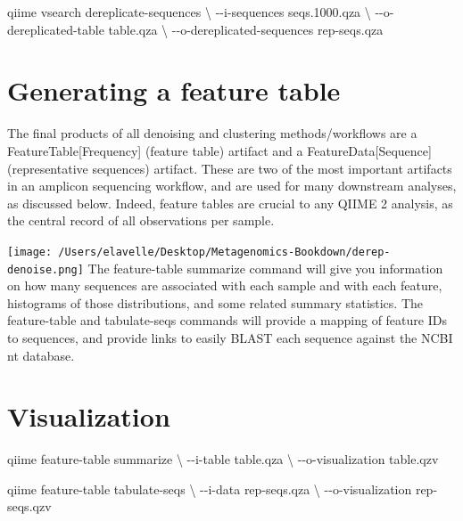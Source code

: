 \documentclass[
]{book}
\newenvironment{Shaded}{\begin{snugshade}}{\end{snugshade}}
\newcommand{\DataTypeTok}[1]{\textcolor[rgb]{0.13,0.29,0.53}{#1}}
\newcommand{\ExtensionTok}[1]{#1}
\newcommand{\NormalTok}[1]{#1}
\begin{document}
\begin{Shaded}
\begin{Highlighting}[]

\ExtensionTok{qiime}\NormalTok{ vsearch dereplicate{-}sequences }\DataTypeTok{\textbackslash{}}
\NormalTok{{-}{-}i{-}sequences seqs.1000.qza }\DataTypeTok{\textbackslash{}}
\NormalTok{{-}{-}o{-}dereplicated{-}table table.qza }\DataTypeTok{\textbackslash{}}
\NormalTok{{-}{-}o{-}dereplicated{-}sequences rep{-}seqs.qza }
\end{Highlighting}
\end{Shaded}

\hypertarget{generating-a-feature-table}{%
\section{Generating a feature table}\label{generating-a-feature-table}}

The final products of all denoising and clustering methods/workflows are a FeatureTable{[}Frequency{]} (feature table) artifact and a FeatureData{[}Sequence{]} (representative sequences) artifact. These are two of the most important artifacts in an amplicon sequencing workflow, and are used for many downstream analyses, as discussed below. Indeed, feature tables are crucial to any QIIME 2 analysis, as the central record of all observations per sample.

\texttt{[image: /Users/elavelle/Desktop/Metagenomics-Bookdown/derep-denoise.png]}
The feature-table summarize command will give you information on how many sequences are associated with each sample and with each feature, histograms of those distributions, and some related summary statistics. The feature-table and tabulate-seqs commands will provide a mapping of feature IDs to sequences, and provide links to easily BLAST each sequence against the NCBI nt database.

\hypertarget{visualization}{%
\section{Visualization}\label{visualization}}

\begin{Shaded}
\begin{Highlighting}[]

\ExtensionTok{qiime}\NormalTok{ feature{-}table summarize }\DataTypeTok{\textbackslash{}}
\NormalTok{{-}{-}i{-}table table.qza }\DataTypeTok{\textbackslash{}}
\NormalTok{{-}{-}o{-}visualization table.qzv}


\ExtensionTok{qiime}\NormalTok{ feature{-}table tabulate{-}seqs }\DataTypeTok{\textbackslash{}}
\NormalTok{{-}{-}i{-}data rep{-}seqs.qza }\DataTypeTok{\textbackslash{}}
\NormalTok{{-}{-}o{-}visualization rep{-}seqs.qzv}
\end{Highlighting}
\end{Shaded}
\end{document}
